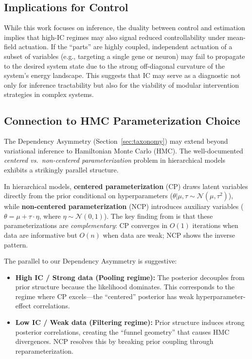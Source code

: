 \documentclass[10pt]{article} %
\theoremstyle{plain}
\theoremstyle{definition}
\begin{document}
\subsection{Implications for Control}

While this work focuses on inference, the duality between control and estimation implies that high-IC regimes may also signal reduced controllability under mean-field actuation. If the ``parts'' are highly coupled, independent actuation of a subset of variables (e.g., targeting a single gene or neuron) may fail to propagate to the desired system state due to the strong off-diagonal curvature of the system's energy landscape. This suggests that IC may serve as a diagnostic not only for inference tractability but also for the viability of modular intervention strategies in complex systems.

\subsection{Connection to HMC Parameterization Choice}
\label{sec:hmc-connection}

The Dependency Asymmetry (Section~\ref{sec:taxonomy}) may extend beyond variational inference to Hamiltonian Monte Carlo (HMC). The well-documented \emph{centered vs.\ non-centered parameterization} problem in hierarchical models \citep{papaspiliopoulos2007general} exhibits a strikingly parallel structure.

In hierarchical models, \textbf{centered parameterization} (CP) draws latent variables directly from the prior conditional on hyperparameters ($\theta | \mu, \tau \sim \mathcal{N}(\mu, \tau^2)$), while \textbf{non-centered parameterization} (NCP) introduces auxiliary variables ($\theta = \mu + \tau \cdot \eta$, where $\eta \sim \mathcal{N}(0,1)$). The key finding from \citet{papaspiliopoulos2007general} is that these parameterizations are \emph{complementary}: CP converges in $O(1)$ iterations when data are informative but $O(n)$ when data are weak; NCP shows the inverse pattern.

The parallel to our Dependency Asymmetry is suggestive:
\begin{itemize}[nosep]
    \item \textbf{High IC / Strong data (Pooling regime):} The posterior decouples from prior structure because the likelihood dominates. This corresponds to the regime where CP excels---the ``centered'' posterior has weak hyperparameter-effect correlations.
    \item \textbf{Low IC / Weak data (Filtering regime):} Prior structure induces strong posterior correlations, creating the ``funnel geometry'' \citep{betancourt2015hamiltonian} that causes HMC divergences. NCP resolves this by breaking prior coupling through reparameterization.
\end{itemize}
\end{document}
